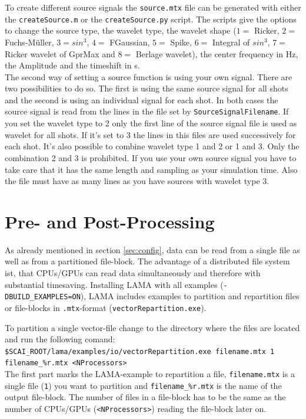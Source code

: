 \documentclass[pdftex,a4paper,parskip,listof=totoc,bibliography=totoc,onehalfspacing,12pt]{scrreprt}
\newcommand{\shellcmd}[1]{\indent\indent\texttt{#1}}	%
\newcommand{\shellcmdline}[1]{\indent\indent\texttt{\quad#1}} 	%
\begin{document}
To create different source signals the \shellcmd{source.mtx} file can be generated with either the \shellcmd{createSource.m} or the \shellcmd{createSource.py} script. The scripts give the options to change the source type, the wavelet type, the wavelet shape ($1=$ Ricker, $2=$ Fuchs-M\"uller, $3=sin^3$, $4=$ FGaussian, $5=$ Spike, $6=$ Integral of $sin^3$, $7=$ Ricker wavelet of GprMax and $8=$ Berlage wavelet), the center frequency in Hz, the Amplitude and the timeshift in s.  \\
The second way of setting a source function is using your own signal. There are two possibilities to do so. The first is using the same source signal for all shots and the second is using an individual signal for each shot. In both cases the source signal is read from the lines in the file set by \verb+SourceSignalFilename+. If you set the wavelet type to 2 only the first line of the source signal file is used as wavelet for all shots. If it's set to 3 the lines in this files are used successively for each shot. It's also possible to combine wavelet type 1 and 2 or 1 and 3. Only the combination 2 and 3 is prohibited. If you use your own source signal you have to take care that it has the same length and sampling as your simulation time. Also the file must have as many lines as you have sources with wavelet type 3. 

\clearpage
\section{Pre- and Post-Processing}\label{sec:process}

As already mentioned in section \ref{sec:config}, data can be read from a single file as well as from a partitioned file-block. The advantage of a distributed file system ist, that CPUs/GPUs can read data simultaneously and therefore with substantial timesaving. Installing LAMA with all examples (\shellcmd{-DBUILD\_EXAMPLES=ON}), LAMA includes examples to partition and repartition files or file-blocks in \shellcmd{.mtx}-format (\shellcmd{vectorRepartition.exe}). 

To partition a single vector-file change to the directory where the files are located and run the following comand:  \\
\shellcmdline{\$SCAI\_ROOT/lama/examples/io/vectorRepartition.exe filename.mtx 1 }\\
\shellcmdline{filename\_\%r.mtx <NProcessors>}\\
The first part marks the LAMA-example to repartition a file, \shellcmd{filename.mtx} is a single file (\shellcmd{1}) you want to partition and \shellcmd{filename\_\%r.mtx} is the name of the output file-block. The number of files in a file-block has to be the same as the number of CPUs/GPUs (\shellcmd{<NProcessors>}) reading the file-block later on. 
\end{document}
